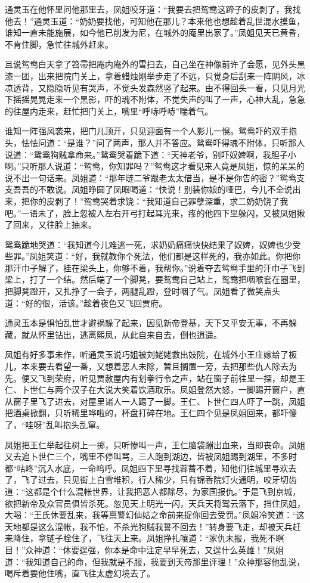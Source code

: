 \documentclass[12pt,oneside]{book}
\begin{document}
通灵玉在他怀里问他那里去，凤姐咬牙道：“我要去把鸳鸯这蹄子的皮剥了，我找他去！”通灵玉道：“奶奶要找他，可知他在那儿？本来他也想趁着乱世混水摸鱼，谁知一直未能施展，如今他已削发为尼，在城外的庵里出家了。”凤姐见天已黄昏，不肯住脚，急忙往城外赶来。

且说鸳鸯白天拿了笤帚把庵内庵外的雪扫去，自己坐在神像前许了会愿，见外头黑漆一团，出来把院门关上，拿着蜡烛刚举步走了不远，只觉身后刮来一阵阴风，冰凉透背，又隐隐听见有哭声，不觉头发森然竖了起来。由不得回头一看，只见月光下摇摇晃晃走来一个黑影，吓的魂不附体，不觉失声的叫了一声，心神大乱，急急的往屋内走来，赶忙把门关上，嘴里“呼哧呼哧”喘着气。

谁知一阵强风袭来，把门儿顶开，只见迎面有一个人影儿一愰。鸳鸯吓的双手抱头，怯怯问道：“是谁？”问了两声，那人并不答应。鸳鸯吓得魂不附体，只听那人说道：“鸳鸯狗贼拿命来。”鸳鸯哭着跪下道：“天神老爷，别吓奴婢啊，我胆子小啊。”只听那人说道：“鸳鸯，你知罪吗？”鸳鸯这才看见来人竟是凤姐，惊的呆呆的说不出一句话来。凤姐道：“那年琏二爷跟老太太借当，是不是你告的密？”鸳鸯支支吾吾的不敢说。凤姐睁圆了凤眼喝道：“快说！别装你娘的哑巴，今儿不全说出来，把你的皮剥了！”鸳鸯哭着求饶：“我知道自己罪孽深重，求二奶奶饶了我吧。”一语未了，脸上忽被人左右开弓打起耳光来，疼的他四下里躲闪，又被凤姐揪了回来，又往脸上抽来。

鸳鸯跪地哭道：“我知道今儿难逃一死，求奶奶痛痛快快结果了奴婢，奴婢也少受些罪。”凤姐笑道：“好，我就教你个死法，他们都是这样死的，我亦如此。你把你那汗巾子解了，挂在梁头上，你够不着，我帮你。”说着夺去鸳鸯手里的汗巾子飞到梁上，打了一个结。然后端了一个脚凳，要鸳鸯自己站上，鸳鸯把咽喉套在圈里，把脚凳蹬开，又扎挣了一会子，两腿乱蹬，登时咽了气。凤姐看了微笑点头道：“好的很，活该。”趁着夜色又飞回贾府。

通灵玉本是惧怕乱世才避祸躲了起来，因见新帝登基，天下又平安无事，不再躲藏，就从怀里钻出，逃离熙凤，从此自来自去，倒也逍遥。

凤姐有好多事未作，听通灵玉说巧姐被刘姥姥救出妓院，在城外小王庄嫁给了板儿，本来要去看望一番，又想着恶人未除，暂且搁置一旁，去把那些仇人除去为先。便又飞到荣府，听见贾赦屋内有划拳行令之声，站在窗子前往里一探，却是王仁、卜世仁与两个汉子在大说大笑着饮酒取乐。凤姐登然大怒，一脚踢开窗户，直从窗子里飞了进去，对屋里诸人一人踢了一脚。王仁、卜世仁四人吓了一跳，凤姐把酒桌掀翻，只听稀里哗啦的，杯盘打碎在地。王仁四个见是凤姐回来，都吓傻了，“哇呀”乱叫抱头乱窜。

凤姐把王仁举起往树上一掷，只听惨叫一声，王仁脑袋蹦出血来，当即丧命。凤姐又去追卜世仁三个，嘴里不停叫骂，三人跑到湖边，皆被凤姐踢到湖里，不多时都“咕咚”沉入水底，一命呜呼。凤姐四下里寻找蓉蔷不着，知他们往城里寻欢去了，飞了过去，只见街上白雪堆积，行人稀少，只有锦香院灯火通明，咬牙切齿道：“这都是个什么混帐世界，让我把恶人都除尽，为家国报仇。”于是飞到京城，欲把新帝及众官员俱皆杀死。忽见天上明光一闪，天兵天将驾云落下，挡住凤姐，大喝：“王氏休要乱来，我等禀警幻仙姑之命前来捉你回去受罚。”凤姐冷笑道：“这天地都是这么混帐，我不怕，不杀光狗贼我誓不回去！”转身要飞走，却被天兵赶来降住，拿链子栓住了，飞往天上来。凤姐挣扎嚷道：“家仇未报，我死不瞑目！”众神道：“休要逞强，你本是命中注定早早死去，又逞什么英雄！”凤姐道：“我知道自己的命，但我就是不服，我要到天帝那里评理！”众神那容他乱说，喝斥着要他住嘴，直飞往太虚幻境去了。
\end{document}
